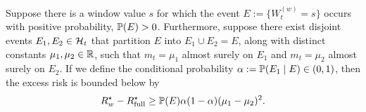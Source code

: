 









\begin{corollary}
\label{cor:atomic_window_lower_bound}
Suppose there is a window value $s$ for which the event $E := \{W_t^{(w)} = s\}$ occurs with positive probability, $\mathbb{P}(E)>0$. Furthermore, suppose there exist disjoint events $E_1, E_2 \in \mathcal{H}_t$ that partition $E$ into $E_1 \cup E_2 = E$, along with distinct constants $\mu_1, \mu_2 \in \mathbb{R}$, such that $m_t = \mu_1$ almost surely on $E_1$ and $m_t = \mu_2$ almost surely on $E_2$. If we define the conditional probability $\alpha := \mathbb{P}(E_1 \mid E) \in (0,1)$, then the excess risk is bounded below by
\begin{equation}
R_w^\star - R_{\mathrm{full}}^\star \ge \mathbb{P}(E)\alpha(1-\alpha)(\mu_1-\mu_2)^2.
\label{eq:explicit_lower_bound}
\end{equation}
\end{corollary}





